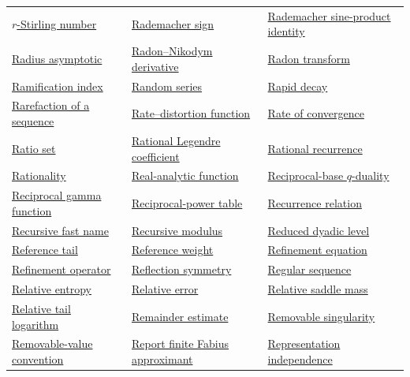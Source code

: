 \documentclass[11pt,oneside]{article}
\begin{document}
\begin{longtable}{L{0.31\textwidth}L{0.31\textwidth}L{0.31\textwidth}}
\hyperlink{gls:r-stirling-number}{\(r\)-Stirling number} & \hyperlink{gls:rademacher-sign}{Rademacher sign} & \hyperlink{gls:rademacher-sine-product}{Rademacher sine-product identity} \\
\hyperlink{gls:radius-asymptotic}{Radius asymptotic} & \hyperlink{gls:radon-nikodym-derivative}{Radon--Nikodym derivative} & \hyperlink{gls:radon-transform}{Radon transform} \\
\hyperlink{gls:ramification-index}{Ramification index} & \hyperlink{gls:random-series}{Random series} & \hyperlink{gls:rapid-decay}{Rapid decay} \\
\hyperlink{gls:rarefaction}{Rarefaction of a sequence} & \hyperlink{gls:rate-distortion-function}{Rate--distortion function} & \hyperlink{gls:rate-of-convergence}{Rate of convergence} \\
\hyperlink{gls:ratio-set}{Ratio set} & \hyperlink{gls:rational-legendre-coefficient}{Rational Legendre coefficient} & \hyperlink{gls:rational-recurrence}{Rational recurrence} \\
\hyperlink{gls:rationality}{Rationality} & \hyperlink{gls:real-analytic-function}{Real-analytic function} & \hyperlink{gls:q-reciprocal-base-duality}{Reciprocal-base \(q\)-duality} \\
\hyperlink{gls:reciprocal-gamma-function}{Reciprocal gamma function} & \hyperlink{gls:reciprocal-power-table}{Reciprocal-power table} & \hyperlink{gls:recurrence-relation}{Recurrence relation} \\
\hyperlink{gls:recursive-fast-name}{Recursive fast name} & \hyperlink{gls:recursive-modulus}{Recursive modulus} & \hyperlink{gls:reduced-dyadic-level}{Reduced dyadic level} \\
\hyperlink{gls:reference-tail}{Reference tail} & \hyperlink{gls:reference-weight}{Reference weight} & \hyperlink{gls:refinement-equation}{Refinement equation} \\
\hyperlink{gls:refinement-operator}{Refinement operator} & \hyperlink{gls:reflection-symmetry}{Reflection symmetry} & \hyperlink{gls:regular-sequence}{Regular sequence} \\
\hyperlink{gls:relative-entropy}{Relative entropy} & \hyperlink{gls:relative-error}{Relative error} & \hyperlink{gls:relative-saddle-mass}{Relative saddle mass} \\
\hyperlink{gls:relative-tail-logarithm}{Relative tail logarithm} & \hyperlink{gls:remainder-estimate}{Remainder estimate} & \hyperlink{gls:removable-singularity}{Removable singularity} \\
\hyperlink{gls:removable-value-convention}{Removable-value convention} & \hyperlink{gls:report-finite-fabius-approximant}{Report finite Fabius approximant} & \hyperlink{gls:representation-independence}{Representation independence} \\

\end{longtable}
\end{document}
